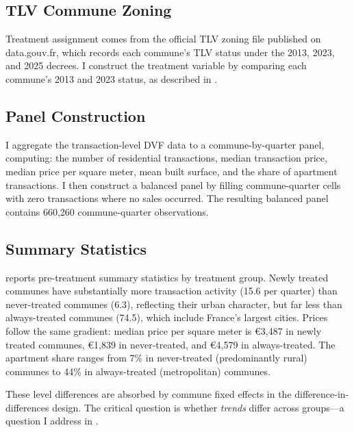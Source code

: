 \documentclass[12pt]{article}
\begin{document}
\subsection{TLV Commune Zoning}

Treatment assignment comes from the official TLV zoning file published on data.gouv.fr, which records each commune's TLV status under the 2013, 2023, and 2025 decrees. I construct the treatment variable by comparing each commune's 2013 and 2023 status, as described in .

\subsection{Panel Construction}

I aggregate the transaction-level DVF data to a commune-by-quarter panel, computing: the number of residential transactions, median transaction price, median price per square meter, mean built surface, and the share of apartment transactions. I then construct a balanced panel by filling commune-quarter cells with zero transactions where no sales occurred. The resulting balanced panel contains 660,260 commune-quarter observations.

\subsection{Summary Statistics}

 reports pre-treatment summary statistics by treatment group. Newly treated communes have substantially more transaction activity (15.6 per quarter) than never-treated communes (6.3), reflecting their urban character, but far less than always-treated communes (74.5), which include France's largest cities. Prices follow the same gradient: median price per square meter is \euro{3,487} in newly treated communes, \euro{1,839} in never-treated, and \euro{4,579} in always-treated. The apartment share ranges from 7\% in never-treated (predominantly rural) communes to 44\% in always-treated (metropolitan) communes.

These level differences are absorbed by commune fixed effects in the difference-in-differences design. The critical question is whether \textit{trends} differ across groups---a question I address in .
\end{document}
